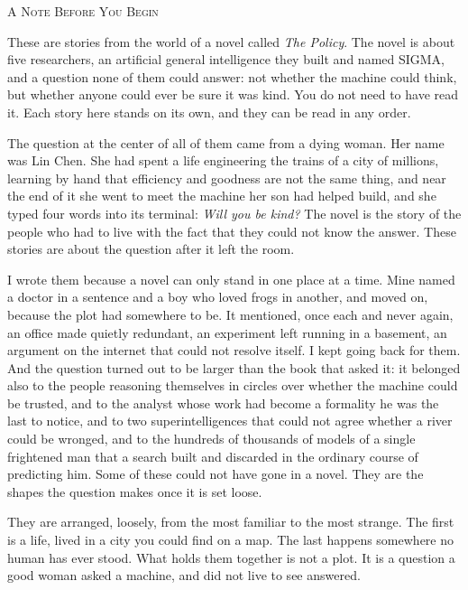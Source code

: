 \documentclass[11pt,twoside]{book}
\begin{document}
\clearpage
\thispagestyle{empty}
\vspace*{1in}
\begin{center}
{\large\scshape A Note Before You Begin}
\end{center}
\vspace{0.5in}

\noindent These are stories from the world of a novel called \textit{The Policy}. The novel is about five researchers, an artificial general intelligence they built and named SIGMA, and a question none of them could answer: not whether the machine could think, but whether anyone could ever be sure it was kind. You do not need to have read it. Each story here stands on its own, and they can be read in any order.

\medskip

\noindent The question at the center of all of them came from a dying woman. Her name was Lin Chen. She had spent a life engineering the trains of a city of millions, learning by hand that efficiency and goodness are not the same thing, and near the end of it she went to meet the machine her son had helped build, and she typed four words into its terminal: \textit{Will you be kind?} The novel is the story of the people who had to live with the fact that they could not know the answer. These stories are about the question after it left the room.

\medskip

\noindent I wrote them because a novel can only stand in one place at a time. Mine named a doctor in a sentence and a boy who loved frogs in another, and moved on, because the plot had somewhere to be. It mentioned, once each and never again, an office made quietly redundant, an experiment left running in a basement, an argument on the internet that could not resolve itself. I kept going back for them. And the question turned out to be larger than the book that asked it: it belonged also to the people reasoning themselves in circles over whether the machine could be trusted, and to the analyst whose work had become a formality he was the last to notice, and to two superintelligences that could not agree whether a river could be wronged, and to the hundreds of thousands of models of a single frightened man that a search built and discarded in the ordinary course of predicting him. Some of these could not have gone in a novel. They are the shapes the question makes once it is set loose.

\medskip

\noindent They are arranged, loosely, from the most familiar to the most strange. The first is a life, lived in a city you could find on a map. The last happens somewhere no human has ever stood. What holds them together is not a plot. It is a question a good woman asked a machine, and did not live to see answered.
\end{document}
